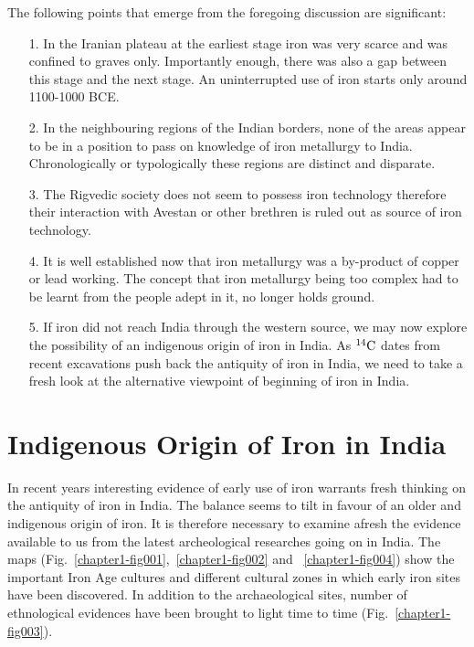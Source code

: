 The following points that emerge from the foregoing discussion are significant:
\begin{itemize}
\item[1.]In the Iranian plateau at the earliest stage iron was very scarce and was confined to graves only. Importantly enough, there was also a gap between this stage and the next stage. An uninterrupted use of iron starts only around 1100-1000 BCE.

\item[2.] In the neighbouring regions of the Indian borders, none of the areas appear to be in a position to pass on knowledge of iron metallurgy to India. Chronologically or typologically these regions are distinct and disparate.

\item[3.] The Rigvedic society does not seem to possess iron technology therefore their interaction with Avestan or other brethren is ruled out as source of iron technology.

\item[4.] It is well established now that iron metallurgy was a by-product of copper or lead working. The concept that iron metallurgy being too complex had to be learnt from the people adept in it, no longer holds ground.

\item[5.] If iron did not reach India through the western source, we may now explore the possibility of an indigenous origin of iron in India. As $^{14}{\rm C}$ dates from recent excavations push back the antiquity of iron in India, we need to take a fresh look at the alternative viewpoint of beginning of iron in India.
\end{itemize}

\vspace{-.5cm}

\section*{Indigenous Origin of Iron in India}\label{chapter3-section-2}

\vspace{-.2cm}

In recent years interesting evidence of early use of iron warrants fresh thinking on the antiquity of iron in India. The balance seems to tilt in favour of an older and indigenous origin of iron. It is therefore necessary to examine afresh the evidence available to us from the latest archeological researches going on in India. The maps (Fig.~\ref{chapter1-fig001},~\ref{chapter1-fig002} and ~\ref{chapter1-fig004}) show the important Iron Age cultures and different cultural zones in which early iron sites have been discovered. In addition to the archaeological sites, number of ethnological evidences have been brought to light time to time (Fig.~\ref{chapter1-fig003}). 

